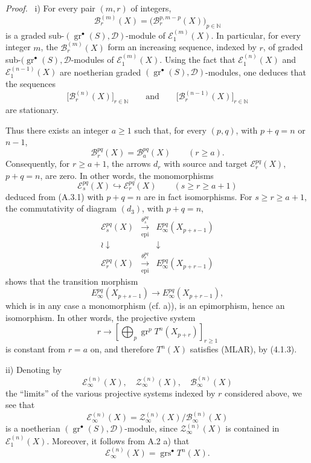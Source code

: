 \documentclass[11pt]{article}
\newenvironment{prooftext}[1][Proof]{\par\noindent\emph{#1.}\ }{\par\medskip}
\providecommand{\gr}{\operatorname{gr}}
\providecommand{\gr}{\operatorname{gr}}
\providecommand{\gr}{\operatorname{gr}}
\providecommand{\grs}{\operatorname{grs}}
\providecommand{\epi}{\operatorname{epi}}
\begin{document}
\begin{prooftext}
i) For every pair \((m,r)\) of integers,
\[
\mathcal B_r^{(m)}(X)=\bigl(\mathcal B_r^{p,m-p}(X)\bigr)_{p\in\mathbb N}
\]
is a graded sub-\((\gr^\bullet(S),\mathcal D)\)-module of \(\mathcal E_1^{(m)}(X)\). In particular, for every integer \(m\), the \(\mathcal B_r^{(m)}(X)\) form an increasing sequence, indexed by \(r\), of graded sub-\((\gr^\bullet(S),\mathcal D\)-modules of \(\mathcal E_1^{(m)}(X)\). Using the fact that \(\mathcal E_1^{(n)}(X)\) and \(\mathcal E_1^{(n-1)}(X)\) are noetherian graded \((\gr^\bullet(S),\mathcal D)\)-modules, one deduces that the sequences
\[
\bigl[\mathcal B_r^{(n)}(X)\bigr]_{r\in\mathbb N}
\qquad\text{and}\qquad
\bigl[\mathcal B_r^{(n-1)}(X)\bigr]_{r\in\mathbb N}
\]
are stationary.

Thus there exists an integer \(a\ge1\) such that, for every \((p,q)\), with \(p+q=n\) or \(n-1\),
\begin{equation}
\mathcal B_r^{pq}(X)=\mathcal B_a^{pq}(X)\qquad(r\ge a).
\tag{A.3.1}
\end{equation}
Consequently, for \(r\ge a+1\), the arrows \(d_r\) with source and target \(\mathcal E_r^{pq}(X)\), \(p+q=n\), are zero. In other words, the monomorphisms
\[
\mathcal E_s^{pq}(X)\hookrightarrow\mathcal E_r^{pq}(X)\qquad(s\ge r\ge a+1)
\]
deduced from (A.3.1) with \(p+q=n\) are in fact isomorphisms. For \(s\ge r\ge a+1\), the commutativity of diagram \((d_3)\), with \(p+q=n\),
\[
\begin{array}{ccc}
\mathcal E_s^{pq}(X)&\xrightarrow[\epi]{\theta_s^{pq}}&E_\infty^{pq}(X_{p+s-1})\\
\wr\downarrow&&\downarrow\\
\mathcal E_r^{pq}(X)&\xrightarrow[\epi]{\theta_r^{pq}}&E_\infty^{pq}(X_{p+r-1})
\end{array}
\]
shows that the transition morphism
\[
E_\infty^{pq}(X_{p+s-1})\longrightarrow E_\infty^{pq}(X_{p+r-1}),
\]
which is in any case a monomorphism (cf. a)), is an epimorphism, hence an isomorphism. In other words, the projective system
\[
r\longrightarrow\left[\bigoplus_p\gr^p T^n(X_{p+r})\right]_{r\ge1}
\]
is constant from \(r=a\) on, and therefore \(T^n(X)\) satisfies (MLAR), by (4.1.3).

ii) Denoting by
\[
\mathcal E_\infty^{(n)}(X),\quad
\mathcal Z_\infty^{(n)}(X),\quad
\mathcal B_\infty^{(n)}(X)
\]
the “limits” of the various projective systems indexed by \(r\) considered above, we see that
\[
\mathcal E_\infty^{(n)}(X)=
\mathcal Z_\infty^{(n)}(X)/\mathcal B_\infty^{(n)}(X)
\]
is a noetherian \((\gr^\bullet(S),\mathcal D)\)-module, since \(\mathcal Z_\infty^{(n)}(X)\) is contained in \(\mathcal E_1^{(n)}(X)\). Moreover, it follows from A.2 a) that
\[
\mathcal E_\infty^{(n)}(X)=\grs^\bullet T^n(X).
\]
\end{prooftext}
\end{document}
